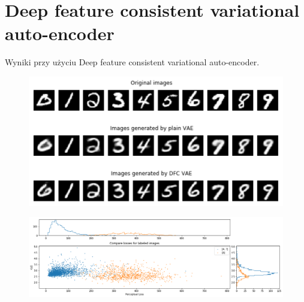 \section{Deep feature consistent variational auto-encoder}

Wyniki przy użyciu Deep feature consistent variational auto-encoder.

\begin{figure}
    \centering
    \includegraphics[width=1.0\textwidth]{images/vae_dfc_gen}
    \caption{}
    \label{fig:vae_dfc_gen}
\end{figure}

\begin{figure}
    \centering
    \includegraphics[width=1.0\textwidth]{images/dfc_mnist_compare}
    \caption{}
    \label{fig:dfc_mnist_compare}
\end{figure}
